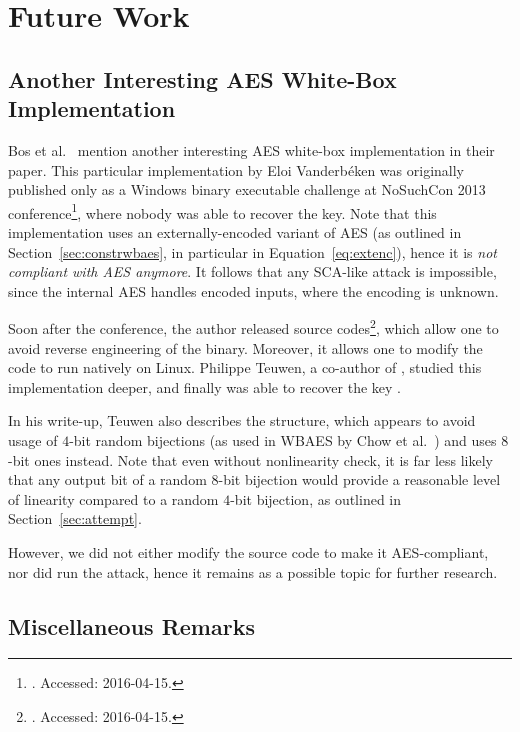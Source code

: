 \chapter{Future Work}
\label{chap:future}

\section{Another Interesting AES White-Box Implementation}
\label{sec:magicimpl}

Bos et al.\ \cite{bos2015differential} mention another interesting AES white-box implementation in their paper. This particular implementation by Eloi Vanderbéken was originally published only as a Windows binary executable challenge at NoSuchCon 2013 conference\footnote{. Accessed: 2016-04-15.}, where nobody was able to recover the key. Note that this implementation uses an externally-encoded variant of AES (as outlined in Section~\ref{sec:constrwbaes}, in particular in Equation~\ref{eq:extenc}), hence it is {\em not compliant with AES anymore}. It follows that any SCA-like attack is impossible, since the internal AES handles encoded inputs, where the encoding is unknown.

Soon after the conference, the author released source codes\footnote{. Accessed: 2016-04-15.}, which allow one to avoid reverse engineering of the binary. Moreover, it allows one to modify the code to run natively on Linux. Philippe Teuwen, a co-author of \cite{bos2015differential}, studied this implementation deeper, and finally was able to recover the key \cite{teuwen2015nscwriteups}.

In his write-up, Teuwen also describes the structure, which appears to avoid usage of $4$-bit random bijections (as used in WBAES by Chow et al.\ \cite{chow2002aes}) and uses $8$-bit ones instead. Note that even without nonlinearity check, it is far less likely that any output bit of a random $8$-bit bijection would provide a reasonable level of linearity compared to a random $4$-bit bijection, as outlined in Section~\ref{sec:attempt}.

However, we did not either modify the source code to make it AES-compliant, nor did run the attack, hence it remains as a possible topic for further research.


\section{Miscellaneous Remarks}

